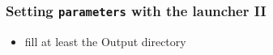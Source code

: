 \documentclass[10pt]{beamer}
\begin{document}
{
\begin{frame}[fragile]
  \frametitle{Setting {\tt parameters} with the launcher II}

\vspace{7.25cm}

\begin{block}{}
\begin{itemize}
\item fill at least the Output directory
\end{itemize}
\end{block}

\end{frame}
}

\end{document}
